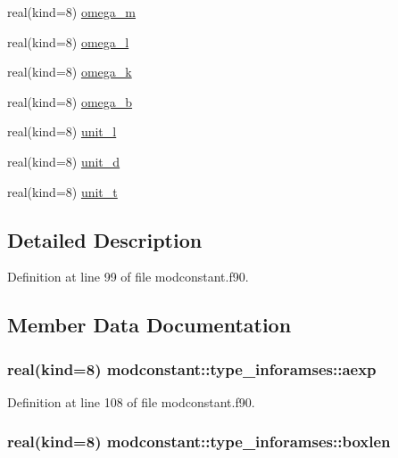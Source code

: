 \begin{DoxyCompactItemize}
\item 
real(kind=8) \hyperlink{structmodconstant_1_1type__inforamses_a57115a017792fc0c4a0f1c952e2efaa5}{omega\-\_\-m}
\item 
real(kind=8) \hyperlink{structmodconstant_1_1type__inforamses_a60ddbe95c4d1d55b91ca1237073fd776}{omega\-\_\-l}
\item 
real(kind=8) \hyperlink{structmodconstant_1_1type__inforamses_abd60017888939e8ef8e477f4022860ae}{omega\-\_\-k}
\item 
real(kind=8) \hyperlink{structmodconstant_1_1type__inforamses_a1a5ae70e575367446fa1a0b9346d8d62}{omega\-\_\-b}
\item 
real(kind=8) \hyperlink{structmodconstant_1_1type__inforamses_a6f87e3e1bebd53aa16cbc67b1a47ad80}{unit\-\_\-l}
\item 
real(kind=8) \hyperlink{structmodconstant_1_1type__inforamses_a9bec2e4699094994b6802b7a63223c20}{unit\-\_\-d}
\item 
real(kind=8) \hyperlink{structmodconstant_1_1type__inforamses_a476201b699ccd42e319364d8975a9293}{unit\-\_\-t}
\end{DoxyCompactItemize}


\subsection{Detailed Description}


Definition at line 99 of file modconstant.\-f90.



\subsection{Member Data Documentation}
\hypertarget{structmodconstant_1_1type__inforamses_a7e17a5532f8e65c4977fb71a8379006c}{
\subsubsection[{aexp}]{\setlength{\rightskip}{0pt plus 5cm}real(kind=8) modconstant\-::type\-\_\-inforamses\-::aexp}}\label{structmodconstant_1_1type__inforamses_a7e17a5532f8e65c4977fb71a8379006c}


Definition at line 108 of file modconstant.\-f90.

\hypertarget{structmodconstant_1_1type__inforamses_a836fde885c81b3643ee595c9eb63b19e}{
\subsubsection[{boxlen}]{\setlength{\rightskip}{0pt plus 5cm}real(kind=8) modconstant\-::type\-\_\-inforamses\-::boxlen}}\label{structmodconstant_1_1type__inforamses_a836fde885c81b3643ee595c9eb63b19e}


